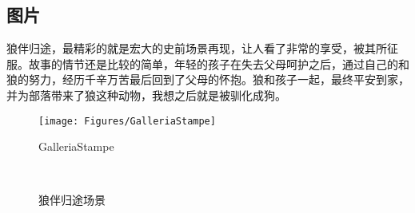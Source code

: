 \documentclass[UTF8, 12pt, oneside]{ctexart}
\begin{document}
\subsection{图片}
狼伴归途，最精彩的就是宏大的史前场景再现，让人看了非常的享受，被其所征服。故事的情节还是比较的简单，年轻的孩子在失去父母呵护之后，通过自己的和狼的努力，经历千辛万苦最后回到了父母的怀抱。狼和孩子一起，最终平安到家，并为部落带来了狼这种动物，我想之后就是被驯化成狗。
\begin{figure}[ht]
	\centering
	\texttt{[image: Figures/GalleriaStampe]}   %
	\caption{GalleriaStampe}\label{woGalleriaStampelf}
\end{figure}

\begin{figure}[ht]
	\centering
	  \\
	\vspace{-0.3cm}
	\caption{狼伴归途场景}\label{wolf2}
\end{figure}
\end{document}
